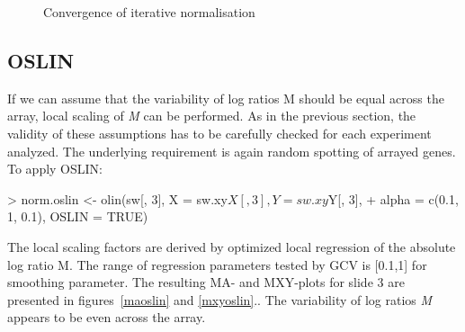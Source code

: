 \documentclass[a4paper,11pt]{article}
\begin{document}
\begin{figure}
\centering
{}
\caption{Convergence of iterative normalisation }
\label{iter}
\end{figure}




\subsection{OSLIN} 
If we can assume that the variability of log ratios M should be equal across the array,
 local scaling of \emph{M} can be performed. As in the previous section, the validity of these assumptions
 has to be carefully checked for each experiment analyzed. The underlying requirement is again random 
spotting of arrayed genes. To apply OSLIN:

\begin{Schunk}
\begin{Sinput}
> norm.oslin <- olin(sw[, 3], X = sw.xy$X[, 3], Y = sw.xy$Y[, 3], 
+ alpha = c(0.1, 1, 0.1), OSLIN = TRUE)
\end{Sinput}
\end{Schunk}

The local scaling factors are  derived by optimized local regression of the absolute log ratio M. 
The range of regression  parameters tested by GCV is [0.1,1] for smoothing parameter. 
The resulting MA- and MXY-plots for slide 3 are presented in figures~\ref{maoslin} and \ref{mxyoslin}.. 
The variability of log ratios \emph{M} appears to be even across the array.
\end{document}
